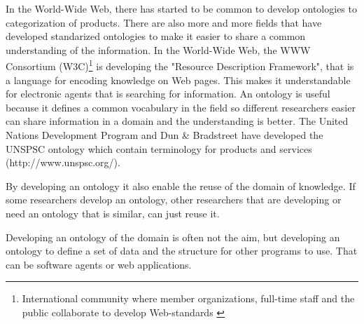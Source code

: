 In the World-Wide Web, there has started to be common to develop ontologies to categorization of products. There are also more and more fields that have developed standarized ontologies to make it easier to share a common understanding of the information. In the World-Wide Web, the WWW Consortium (W3C)\footnote{International community where member organizations, full-time staff and the public collaborate to develop Web-standards \cite{website:w3c}} is developing the "Resource Description Framework", that is a language for encoding knowledge on Web pages. This makes it understandable for electronic agents that is searching for information. An ontology is useful because it defines a common vocabulary in the field so different researchers easier can share information in a domain and the understanding is better. The United Nations Development Program and Dun \& Bradstreet have developed the UNSPSC ontology which contain terminology for products and services (http://www.unspsc.org/).

By developing an ontology it also enable the reuse of the domain of knowledge. If some researchers develop an ontology, other researchers that are developing or need an ontology that is similar, can just reuse it.

Developing an ontology of the domain is often not the aim, but developing an ontology to define a set of data and the structure for other programs to use. That can be software agents or web applications.\cite{website:standford}